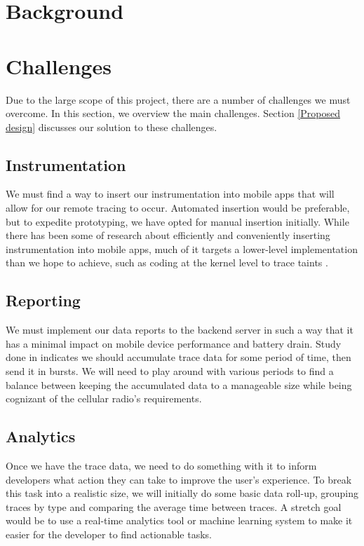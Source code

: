 \documentclass{acm_proc_article-sp}
\begin{document}
\section{Background}


\section{Challenges}
Due to the large scope of this project, there are a number of challenges we must overcome.
In this section, we overview the main challenges. Section \ref{Proposed design} discusses
our solution to these challenges.

\subsection{Instrumentation}
We must find a way to insert our instrumentation into mobile apps that will
allow for our remote tracing to occur. Automated insertion would be preferable,
but to expedite prototyping, we have opted for manual insertion initially.
While there has been some of research about efficiently and conveniently inserting
instrumentation into mobile apps, much of it targets a lower-level implementation than
we hope to achieve, such as coding at the kernel level to trace taints \cite{TaintDroid}.

\subsection{Reporting}
We must implement our data reports to the backend server in such a way that it
has a minimal impact on mobile device performance and battery drain. Study done
in \cite{PeriodicTransfers} indicates we should accumulate trace data for some
period of time, then send it in bursts. We will need to play around with various
periods to find a balance between keeping the accumulated data to a manageable
size while being cognizant of the cellular radio's requirements.

\subsection{Analytics}
Once we have the trace data, we need to do something with it to inform developers
what action they can take to improve the user's experience. To break this task
into a realistic size, we will initially do some basic data roll-up, grouping
traces by type and comparing the average time between traces. A stretch goal
would be to use a real-time analytics tool or machine learning system 
to make it easier for the developer to find actionable tasks.
\end{document}
